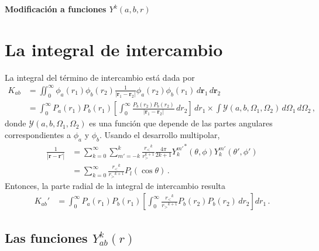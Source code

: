 \documentclass[11pt]{article}
\begin{document}

\begin{center}
\Large\bf
Modificación a funciones $Y^k(a,b,r)$ 
\end{center}

\section{La integral de intercambio}
La integral del término de intercambio está dada por
\begin{align}
K_{ab} &= \iint_0^{\infty}{ \phi_a(r_1)\phi_b(r_2)\frac{1}{\left|\mathbf{r}_1-\mathbf{r}_2\right|}\phi_a(r_2)\phi_b(r_1)}\,d\mathbf{r}_1\,d\mathbf{r}_2\\
 &= \int_0^{\infty} P_a(r_1)P_b(r_1) \left[ \int_0^{\infty} \frac{P_b(r_2)P_b(r_2)}{\left|\mathbf{r}_1-\mathbf{r}_2\right|}\,dr_2 \right] \,dr_1 \times \int \mathcal{Y}(a,b,\Omega_1,\Omega_2)\,d\Omega_1\,d\Omega_2\,,
\end{align}
donde $\mathcal{Y}(a,b,\Omega_1,\Omega_2)$ es una función que depende de las partes angulares correspondientes a $\phi_a$ y $\phi_b$. 
Usando el desarrollo multipolar,
\begin{align}
 \frac{1}{\left|\mathbf{r}-\mathbf{r}'\right|} &= \sum_{k=0}^{\infty}\sum_{m'=-k}^{k}{\frac{{r_<}^k}{r_>^{k+1}} 
\frac{4\pi}{2k+1}{Y_k^{m'}}^* (\theta,\phi){Y_k^{m'}}(\theta',\phi') } \\
 &=\sum_{k=0}^{\infty}{\frac{{r_<}^k}{{r_>}^{k+1}}P_l(\cos\theta)} \,.
\end{align}
Entonces, la parte radial de la integral de intercambio resulta
\begin{align}
K_{ab}' &= \int_0^{\infty} P_a(r_1)P_b(r_1) \left[ \int_0^{\infty} \frac{{r_<}^k}{{r_>}^{k+1}}P_b(r_2)P_b(r_2)\,dr_2 \right] dr_1\,.
\label{eq:Kab_radial}
\end{align}


\subsection{Las funciones $Y_{ab}^k(r)$}
\end{document}

